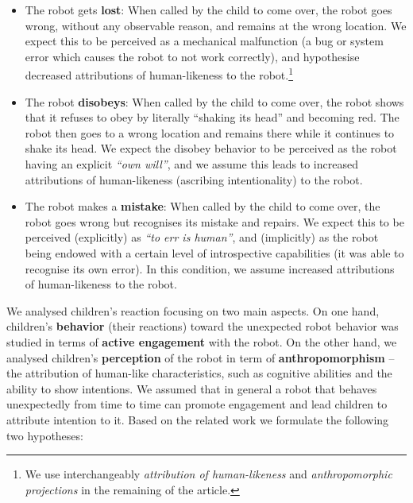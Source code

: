 \documentclass[letterpaper, 10pt, conference]{ieeeconf}
\begin{document}
\begin{itemize}

    \item The robot gets \textbf{lost}: When called by the child to come over,
        the robot goes wrong, without any observable reason, and remains at the
        wrong location. We expect this to be perceived as a mechanical
        malfunction (a bug or system error which causes the robot to not work
        correctly), and hypothesise decreased attributions of human-likeness to
        the robot.\footnote{We use interchangeably \textit{attribution of
            human-likeness} and \textit{anthropomorphic projections} in the
        remaining of the article.} 

    \item The robot \textbf{disobeys}: When called by the child to come over, the
        robot shows that it refuses to obey by literally ``shaking its head'' and
        becoming red. The robot then goes to a wrong location and remains there
        while it continues to shake its head. We expect the disobey behavior to
        be perceived as the robot having an explicit \textit{``own will''}, and
        we assume this leads to increased attributions of human-likeness
        (ascribing intentionality) to the robot.

    \item The robot makes a \textbf{mistake}: When called by the child to come
        over, the robot goes wrong but recognises its mistake and repairs. We
        expect this to be perceived (explicitly) as \textit{``to err is
        human''}, and (implicitly) as the robot being endowed with a certain
        level of introspective capabilities (it was able to recognise its own
        error). In this condition, we assume increased attributions of
        human-likeness to the robot.

\end{itemize}

We analysed children's reaction focusing on two main aspects. On one hand,
children's \textbf{behavior} (their reactions) toward the unexpected robot
behavior was studied in terms of \textbf{active engagement} with the robot. On
the other hand, we analysed children's \textbf{perception} of the robot in term
of \textbf{anthropomorphism} -- the attribution of human-like characteristics,
such as cognitive abilities and the ability to show intentions. We assumed that
in general a robot that behaves unexpectedly from time to time can promote
engagement and lead children to attribute intention to it. Based
on the related work we formulate the following two hypotheses:
\end{document}
